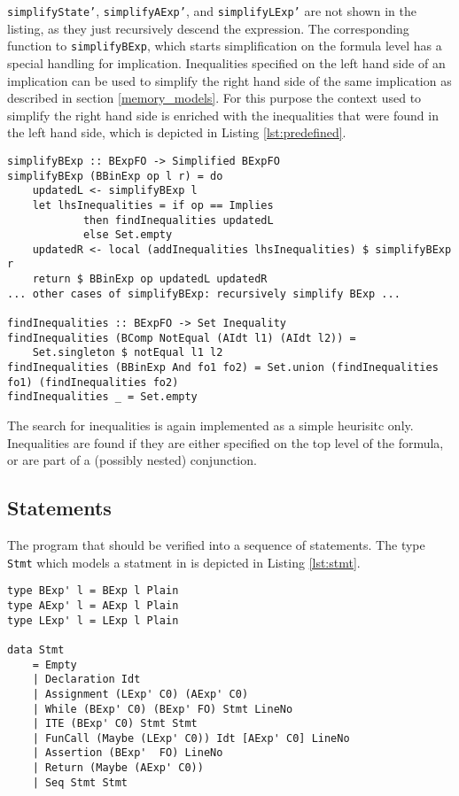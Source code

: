 \documentclass[12pt]{article}
\begin{document}
\texttt{simplifyState'}, \texttt{simplifyAExp'}, and \texttt{simplifyLExp'} are not shown in the listing, as they just recursively descend the expression.
The corresponding function to \texttt{simplifyBExp}, which starts simplification on the formula level has a special handling for implication. 
Inequalities specified on the left hand side of an implication can be used to simplify the right hand side of the same implication as described in section \ref{memory_models}.
For this purpose the context used to simplify the right hand side is enriched with the inequalities that were found in the left hand side, which is depicted in Listing \ref{lst:predefined}.

\begin{lstlisting}[style=c0, caption=searching for predefined inequalities, label=lst:predefined]
simplifyBExp :: BExpFO -> Simplified BExpFO
simplifyBExp (BBinExp op l r) = do
    updatedL <- simplifyBExp l
    let lhsInequalities = if op == Implies 
            then findInequalities updatedL 
            else Set.empty
    updatedR <- local (addInequalities lhsInequalities) $ simplifyBExp r
    return $ BBinExp op updatedL updatedR
... other cases of simplifyBExp: recursively simplify BExp ...

findInequalities :: BExpFO -> Set Inequality
findInequalities (BComp NotEqual (AIdt l1) (AIdt l2)) = 
    Set.singleton $ notEqual l1 l2
findInequalities (BBinExp And fo1 fo2) = Set.union (findInequalities fo1) (findInequalities fo2)
findInequalities _ = Set.empty
\end{lstlisting}

The search for inequalities is again implemented as a simple heurisitc only.
Inequalities are found if they are either specified on the top level of the formula, or are part of a (possibly nested) conjunction.

\subsection{Statements}

The program that should be verified into a sequence of statements.
The type \texttt{Stmt} which models a statment in \verifyc is depicted in Listing \ref{lst:stmt}.

\begin{minipage}{\linewidth}
\begin{lstlisting}[style=c0, caption=Stmt, label=lst:stmt]
type BExp' l = BExp l Plain
type AExp' l = AExp l Plain
type LExp' l = LExp l Plain
    
data Stmt 
    = Empty
    | Declaration Idt
    | Assignment (LExp' C0) (AExp' C0)
    | While (BExp' C0) (BExp' FO) Stmt LineNo
    | ITE (BExp' C0) Stmt Stmt
    | FunCall (Maybe (LExp' C0)) Idt [AExp' C0] LineNo
    | Assertion (BExp'  FO) LineNo
    | Return (Maybe (AExp' C0))
    | Seq Stmt Stmt
\end{lstlisting}
\end{minipage}
\end{document}
